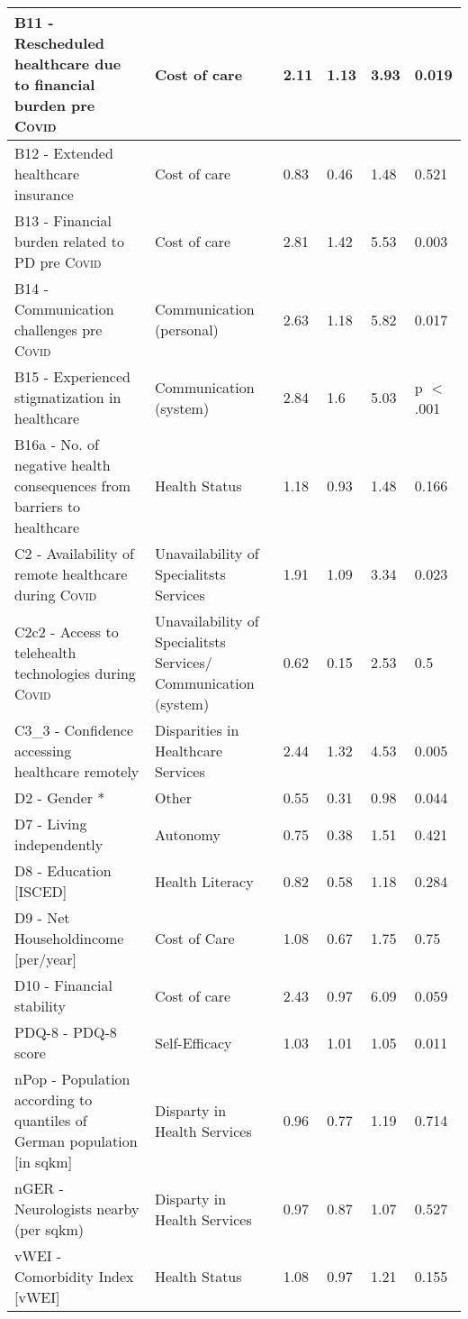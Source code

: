 \documentclass[a4paper,oneside,11pt,english]{scrartcl}
\begin{document}
\begin{longtable}[ht!]{|p{5.5cm} | p{3.5cm} | p{1cm} | l | l | p{1.5cm} |}
		B11 - Rescheduled healthcare due to financial burden pre \textsc{Covid} & Cost of care & 2.11 & 1.13 & 3.93 & 0.019 \\ \hline
		B12 - Extended healthcare insurance & Cost of care & 0.83 & 0.46 & 1.48 & 0.521 \\ \hline
		B13 - Financial burden related to \textsc{PD} pre \textsc{Covid} & Cost of care & 2.81 & 1.42 & 5.53 & 0.003 \\ \hline
		B14 - Communication challenges pre \textsc{Covid} & Communication (personal) & 2.63 & 1.18 & 5.82 & 0.017 \\ \hline
		B15 - Experienced stigmatization in healthcare & Communication (system) & 2.84 & 1.6 & 5.03 & p $<$ .001 \\ \hline
		B16a - No. of negative health consequences from barriers to healthcare & Health Status & 1.18 & 0.93 & 1.48 & 0.166 \\ \hline
		C2 - Availability of remote healthcare during \textsc{Covid} & Unavailability of Specialitsts Services & 1.91 & 1.09 & 3.34 & 0.023 \\ \hline
		C2c2 - Access to telehealth technologies during \textsc{Covid} & Unavailability of Specialitsts Services/ Communication (system) & 0.62 & 0.15 & 2.53 & 0.5 \\ \hline
		C3\_3 - Confidence accessing healthcare remotely & Disparities in Healthcare Services & 2.44 & 1.32 & 4.53 & 0.005 \\ \hline
		D2 - Gender * & Other & 0.55 & 0.31 & 0.98 & 0.044 \\ \hline
		D7 - Living independently & Autonomy & 0.75 & 0.38 & 1.51 & 0.421 \\ \hline
		D8 - Education [ISCED] & Health Literacy & 0.82 & 0.58 & 1.18 & 0.284 \\ \hline
		D9 - Net Householdincome [per/year] & Cost of Care & 1.08 & 0.67 & 1.75 & 0.75 \\ \hline
		D10 - Financial stability & Cost of care & 2.43 & 0.97 & 6.09 & 0.059 \\ \hline
		\textsc{PD}Q-8 - \textsc{PD}Q-8 score & Self-Efficacy & 1.03 & 1.01 & 1.05 & 0.011 \\ \hline
		nPop - Population according to quantiles of German population [in sqkm] & Disparty in Health Services & 0.96 & 0.77 & 1.19 & 0.714 \\ \hline
		nGER - Neurologists nearby (per sqkm) & Disparty in Health Services & 0.97 & 0.87 & 1.07 & 0.527 \\ \hline
		vWEI - Comorbidity Index [vWEI] & Health Status & 1.08 & 0.97 & 1.21 & 0.155 \\ \hline
\end{longtable}
\end{document}
